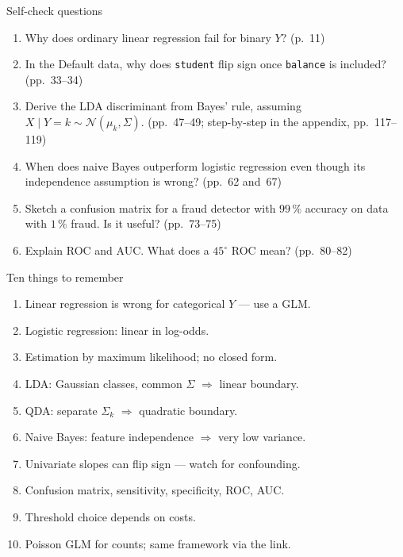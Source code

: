 \documentclass[aspectratio=169,11pt]{beamer}
\begin{document}
\begin{frame}{Self-check questions}
  \begin{enumerate}
    \item Why does ordinary linear regression fail for binary $Y$?
          (p.~11)
    \item In the Default data, why does \texttt{student} flip sign
          once \texttt{balance} is included? (pp.~33--34)
    \item Derive the LDA discriminant from Bayes' rule, assuming
          $X \mid Y = k \sim \mathcal{N}(\mu_k, \Sigma)$.
          (pp.~47--49; step-by-step in the appendix, pp.~117--119)
    \item When does naive Bayes outperform logistic regression even
          though its independence assumption is wrong? (pp.~62 and~67)
    \item Sketch a confusion matrix for a fraud detector with $99\,\%$
          accuracy on data with $1\,\%$ fraud. Is it useful?
          (pp.~73--75)
    \item Explain ROC and AUC. What does a $45^\circ$ ROC mean?
          (pp.~80--82)
  \end{enumerate}
\end{frame}

\begin{frame}{Ten things to remember}
  \begin{enumerate}
    \item Linear regression is wrong for categorical $Y$ --- use a GLM.
    \item Logistic regression: linear in log-odds.
    \item Estimation by maximum likelihood; no closed form.
    \item LDA: Gaussian classes, common $\Sigma$ $\Rightarrow$ linear
          boundary.
    \item QDA: separate $\Sigma_k$ $\Rightarrow$ quadratic boundary.
    \item Naive Bayes: feature independence $\Rightarrow$ very low
          variance.
    \item Univariate slopes can flip sign --- watch for confounding.
    \item Confusion matrix, sensitivity, specificity, ROC, AUC.
    \item Threshold choice depends on costs.
    \item Poisson GLM for counts; same framework via the link.
  \end{enumerate}
\end{frame}
\end{document}

